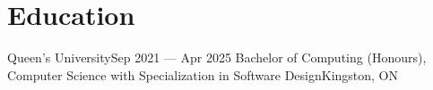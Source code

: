 \section{Education}
    \resumeSubHeadingListStart

    \resumeSubheading
    {Queen's University}{Sep 2021 --- Apr 2025}
    {Bachelor of Computing (Honours), Computer Science with Specialization in Software Design}{Kingston, ON}
    \resumeItemListStart
    \resumeItemListEnd

    \resumeSubHeadingListEnd

